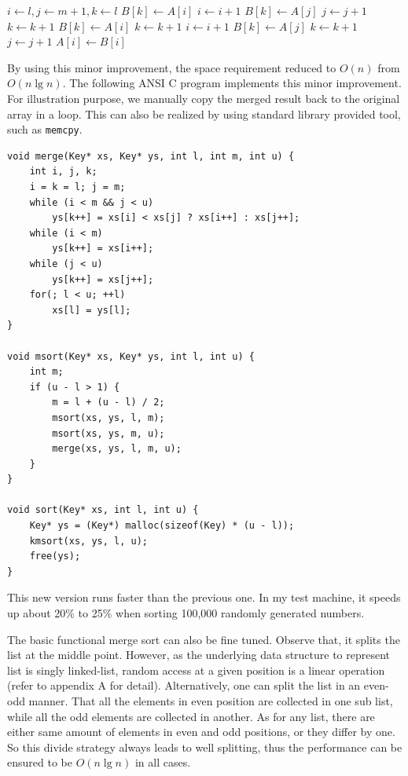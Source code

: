 \documentclass[b5paper]{article}
\begin{document}
\begin{algorithmic}[1]
  \State $i \gets l, j \gets m + 1, k \gets l$
      \State $B[k] \gets A[i]$
      \State $i \gets i + 1$
    \Else
      \State $B[k] \gets A[j]$
      \State $j \gets j + 1$
    \EndIf
    \State $k \gets k + 1$
  \EndWhile
    \State $B[k] \gets A[i]$
    \State $k \gets k + 1$
    \State $i \gets i + 1$
  \EndWhile
    \State $B[k] \gets A[j]$
    \State $k \gets k + 1$
    \State $j \gets j + 1$
  \EndWhile
   
    \State $A[i] \gets B[i]$
  \EndFor
\EndProcedure
\end{algorithmic}

By using this minor improvement, the space requirement reduced to $O(n)$ from $O(n \lg n)$.
The following ANSI C program implements this minor improvement. For illustration purpose,
we manually copy the merged result back to the original array in a loop. This can also
be realized by using standard library provided tool, such as \texttt{memcpy}.

\lstset{language=C}
\begin{lstlisting}
void merge(Key* xs, Key* ys, int l, int m, int u) {
    int i, j, k;
    i = k = l; j = m;
    while (i < m && j < u)
        ys[k++] = xs[i] < xs[j] ? xs[i++] : xs[j++];
    while (i < m)
        ys[k++] = xs[i++];
    while (j < u)
        ys[k++] = xs[j++];
    for(; l < u; ++l)
        xs[l] = ys[l];
}

void msort(Key* xs, Key* ys, int l, int u) {
    int m;
    if (u - l > 1) {
        m = l + (u - l) / 2;
        msort(xs, ys, l, m);
        msort(xs, ys, m, u);
        merge(xs, ys, l, m, u);
    }
}

void sort(Key* xs, int l, int u) {
    Key* ys = (Key*) malloc(sizeof(Key) * (u - l));
    kmsort(xs, ys, l, u);
    free(ys);
}
\end{lstlisting}

This new version runs faster than the previous one. In my test machine, it speeds up about 20\% to 25\% when sorting
100,000 randomly generated numbers.

The basic functional merge sort can also be fine tuned. Observe that, it splits the list at the middle point. However,
as the underlying data structure to represent list is singly linked-list, random access at a given position is
a linear operation (refer to appendix A for detail). Alternatively, one can split the list in an even-odd manner.
That all the elements in even position are collected in one sub list, while all the odd elements are collected
in another. As for any list, there are either same amount of elements in even and odd positions, or they
differ by one. So this divide strategy always leads to well splitting, thus the performance can be ensured
to be $O(n \lg n)$ in all cases.
\end{document}
